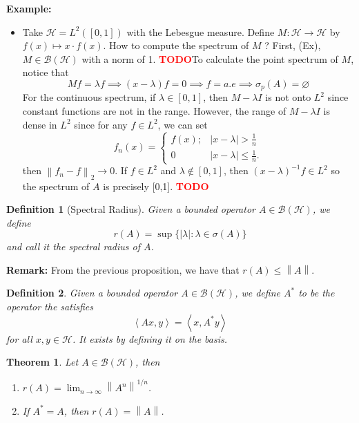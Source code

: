 \documentclass{article}
\newtheorem*{theorem}{Theorem}
\newtheorem*{definition}{Definition}
\newcommand{\B}{\mathcal{B}}
\renewcommand{\H}{\mathcal{H}}
\newcommand{\lnorm}[2]{\left\lVert#2 \right\rVert_{#1}}
\newcommand{\inner}[2]{\left\langle#1 , #2 \right\rangle}
\newcommand{\norm}[1]{\left\lVert#1 \right\rVert}
\newcommand{\td}{\textcolor{red}{\textbf{TODO}}}
\newenvironment{example}{\noindent\textbf{Example:} \vspace{-0.2cm}\begin{itemize}}{\end{itemize}}
\newenvironment{remark}{\noindent\textbf{Remark:}}{}
\begin{document}
\begin{example}
    \item Take $\H = L^2([0,1])$ with the Lebesgue measure. Define $M : \H \to \H$ by $f(x) \mapsto x\cdot f(x)$. How to compute the spectrum of $M$ ? First, (Ex), $M \in \B(\H)$ with a norm of 1. \td To calculate the point spectrum of $M$, notice that
    $$Mf = \lambda f \implies (x - \lambda)f = 0 \implies f = a.e \implies \sigma_p(A) = \varnothing$$
    For the continuous spectrum, if $\lambda \in [0,1]$, then $M-\lambda I$ is not onto $L^2$ since constant functions are not in the range. However, the range of $M - \lambda I$ is dense in $L^2$ since for any $f \in L^2$, we can set
    $$f_n(x) = \begin{cases}
        f(x); & |x - \lambda| > \frac{1}{n} \\ 0 & |x - \lambda| \leq \frac{1}{n}.
    \end{cases}$$
    then $\lnorm{2}{f_n - f} \rightarrow 0$. If $f \in L^2$ and $\lambda \notin [0,1]$, then $(x - \lambda)^{-1}f \in L^2$ so the spectrum of $A$ is precisely [0,1]. \td 
\end{example}

\begin{definition}[Spectral Radius]
    Given a bounded operator $A \in \B(\H)$, we define
    $$r(A) = \sup\{|\lambda| : \lambda \in \sigma(A)\}$$
    and call it the spectral radius of $A$.
\end{definition}

\begin{remark}
    From the previous proposition, we have that $r(A) \leq \norm{A}$.
\end{remark}

\begin{definition}
    Given a bounded operator $A \in \B(\H)$, we define $A^*$ to be the operator the satisfies
    $$\inner{Ax}{y} = \inner{x}{A^* y}$$
    for all $x,y \in \H$. It exists by defining it on the basis. 
\end{definition}

\begin{theorem}
    Let $A \in \B(\H)$, then
    \begin{enumerate}[label=(\alph*)]
        \item $r(A) = \lim_{n \rightarrow \infty} \norm{A^n}^{1/n}$.
        \item If $A^* = A$, then $r(A) = \norm{A}$.
    \end{enumerate}
\end{theorem}
\end{document}
